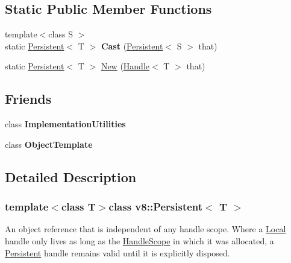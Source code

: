 \subsection*{Static Public Member Functions}
\begin{DoxyCompactItemize}
\item 
\hypertarget{classv8_1_1_persistent_acbec7ad50987d77ba176547a14ba814c}{}{\footnotesize template$<$class S $>$ }\\static \hyperlink{classv8_1_1_persistent}{Persistent}$<$ T $>$ {\bfseries Cast} (\hyperlink{classv8_1_1_persistent}{Persistent}$<$ S $>$ that)\label{classv8_1_1_persistent_acbec7ad50987d77ba176547a14ba814c}

\item 
static \hyperlink{classv8_1_1_persistent}{Persistent}$<$ T $>$ \hyperlink{classv8_1_1_persistent_ad309269ccaeffa6dec338093752ca539}{New} (\hyperlink{classv8_1_1_handle}{Handle}$<$ T $>$ that)
\end{DoxyCompactItemize}
\subsection*{Friends}
\begin{DoxyCompactItemize}
\item 
\hypertarget{classv8_1_1_persistent_ac7b520085953e146d849e05253267f72}{}class {\bfseries Implementation\+Utilities}\label{classv8_1_1_persistent_ac7b520085953e146d849e05253267f72}

\item 
\hypertarget{classv8_1_1_persistent_a4d28646409234f556983be8a96c06424}{}class {\bfseries Object\+Template}\label{classv8_1_1_persistent_a4d28646409234f556983be8a96c06424}

\end{DoxyCompactItemize}


\subsection{Detailed Description}
\subsubsection*{template$<$class T$>$class v8\+::\+Persistent$<$ T $>$}

An object reference that is independent of any handle scope. Where a \hyperlink{classv8_1_1_local}{Local} handle only lives as long as the \hyperlink{classv8_1_1_handle_scope}{Handle\+Scope} in which it was allocated, a \hyperlink{classv8_1_1_persistent}{Persistent} handle remains valid until it is explicitly disposed.

